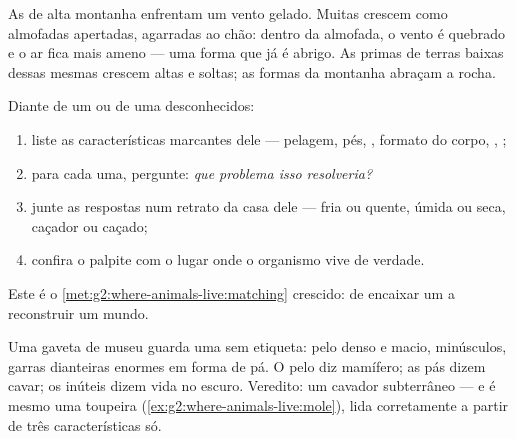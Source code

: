 \begin{example}\label{ex:g4:adapted-to-their-world:alpine}
As  de alta montanha enfrentam um vento gelado. Muitas
crescem como almofadas apertadas, agarradas ao chão: dentro da
almofada, o vento é quebrado e o ar fica mais ameno --- uma forma que
já é abrigo. As primas de terras baixas dessas mesmas 
crescem altas e soltas; as formas da montanha abraçam a rocha.
\end{example}

\begin{method}\label{met:g4:adapted-to-their-world:read}
Diante de um  ou de uma  desconhecidos:
\begin{enumerate}
  \item liste as características marcantes dele --- pelagem, pés,
        , formato do corpo, , ;
  \item para cada uma, pergunte: \emph{que problema isso resolveria?}
  \item junte as respostas num retrato da casa dele --- fria ou
        quente, úmida ou seca, caçador ou caçado;
  \item confira o palpite com o lugar onde o organismo vive de
        verdade.
\end{enumerate}
Este é o \cref{met:g2:where-animals-live:matching} crescido: de
encaixar um  a reconstruir um mundo.
\end{method}

\begin{example}\label{ex:g4:adapted-to-their-world:mystery}
Uma gaveta de museu guarda uma  sem etiqueta: pelo denso e
macio,  minúsculos, garras dianteiras enormes em forma de pá. O
pelo diz mamífero; as pás dizem cavar; os  inúteis dizem vida no
escuro. Veredito: um cavador subterrâneo --- e é mesmo uma toupeira
(\cref{ex:g2:where-animals-live:mole}), lida corretamente a partir
de três características só.
\end{example}

